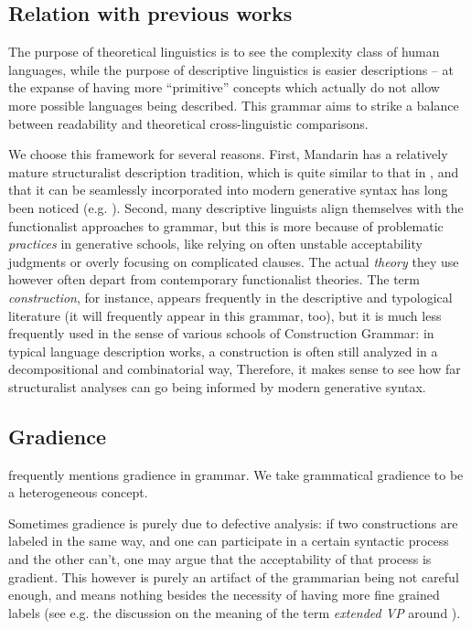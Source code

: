 \documentclass[UTF8, a4paper, oneside, scheme=plain, 12pt]{ctexrep}
\newcommand*{\term}[1]{\emph{#1}}
\begin{document}
{\subsection{Relation with previous works}\label{sec:grammatical.previous}

The purpose of theoretical linguistics is to see the complexity class of human languages,
while the purpose of descriptive linguistics is easier descriptions
-- at the expanse of having more ``primitive'' concepts
which actually do not allow more possible languages being described.
This grammar aims to strike a balance between readability and theoretical cross-linguistic comparisons.

We choose this framework for several reasons.
First, Mandarin has a relatively mature structuralist description tradition,
which is quite similar to that in \citet{cgel},
and that it can be seamlessly incorporated into modern generative syntax 
has long been noticed (e.g. \citealt{deng2010formal}).
Second, many descriptive linguists align themselves with the functionalist approaches to grammar,
but this is more because of problematic \emph{practices} in generative schools,
like relying on often unstable acceptability judgments
or overly focusing on complicated clauses.
The actual \emph{theory} they use however often depart from contemporary functionalist theories.
The term \term{construction}, for instance,
appears frequently in the descriptive and typological literature
(it will frequently appear in this grammar, too),
but it is much less frequently used in the sense of various schools of Construction Grammar:
in typical language description works, a construction is often still analyzed 
in a decompositional and combinatorial way,
Therefore, it makes sense to see how far structuralist analyses can go
being informed by modern generative syntax.

\subsection{Gradience}\label{sec:theory.gradience}

\citet{quirk1985} frequently mentions gradience in grammar.
We take grammatical gradience to be a heterogeneous concept.

Sometimes gradience is purely due to defective analysis:
if two constructions are labeled in the same way,
and one can participate in a certain syntactic process and the other can't,
one may argue that the acceptability of that process is gradient.
This however is purely an artifact of the grammarian being not careful enough,
and means nothing besides the necessity of having more fine grained labels
(see e.g. the discussion on the meaning of the term \term{extended VP} around ).

}
\end{document}
